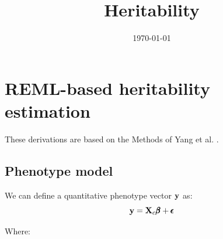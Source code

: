 \documentclass[12pt]{article}
\title{Heritability}
\date{\today}
\begin{document}
\maketitle

\section{REML-based heritability estimation}
These derivations are based on the Methods of Yang et al. \citep{yang2010natgen}.

\subsection{Phenotype model}
We can define a quantitative phenotype vector $\mathbf{y}$ as:
$$ \mathbf{y} = \mathbf{X}_c \pmb{\beta} + \pmb{\epsilon} $$

Where:
\end{document}
